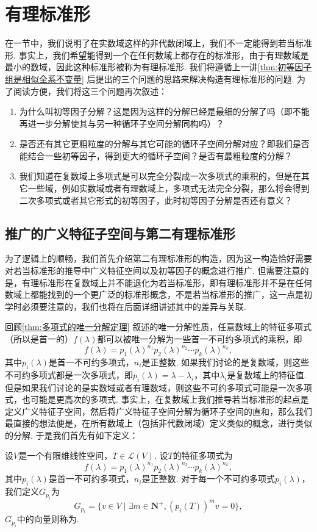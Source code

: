 \chapter{有理标准形}

在一节中，我们说明了在实数域这样的非代数闭域上，我们不一定能得到若当标准形. 事实上，我们希望能得到一个在任何数域上都存在的标准形，由于有理数域是最小的数域，因此这种标准形被称为有理标准形. 我们将遵循上一讲\autoref{thm:初等因子组是相似全系不变量} 后提出的三个问题的思路来解决构造有理标准形的问题. 为了阅读方便，我们将这三个问题再次叙述：
\begin{enumerate}
    \item 为什么叫初等因子分解？这是因为这样的分解已经是最细的分解了吗（即不能再进一步分解使其与另一种循环子空间分解同构吗）？
    \item 是否还有其它更粗粒度的分解与其它可能的循环子空间分解对应？即我们是否能结合一些初等因子，得到更大的循环子空间？是否有最粗粒度的分解？
    \item 我们知道在复数域上多项式是可以完全分裂成一次多项式的乘积的，但是在其它一些域，例如实数域或者有理数域上，多项式无法完全分裂，那么将会得到二次多项式或者其它形式的初等因子，此时初等因子分解是否还有意义？
\end{enumerate}

\section{推广的广义特征子空间与第二有理标准形}
为了逻辑上的顺畅，我们首先介绍第二有理标准形的构造，因为这一构造恰好需要对若当标准形的推导中广义特征空间以及初等因子的概念进行推广. 但需要注意的是，有理标准形在复数域上并不能退化为若当标准形，即有理标准形并不是在任何数域上都能找到的一个更广泛的标准形概念，不是若当标准形的推广，这一点是初学时必须要注意的，我们也将在后面详细讲述其中的差异与关联.

回顾\autoref{thm:多项式的唯一分解定理} 叙述的唯一分解性质，任意数域上的特征多项式（所以是首一的）$f(\lambda)$都可以被唯一分解为一些首一不可约多项式的乘积，即
\[f(\lambda)=p_1(\lambda)^{n_1}p_2(\lambda)^{n_2}\cdots p_k(\lambda)^{n_k},\]
其中$p_i(\lambda)$是首一不可约多项式，$n_i$是正整数. 如果我们讨论的是复数域，则这些不可约多项式都是一次多项式，即$p_i(\lambda)=\lambda-\lambda_i$，其中$\lambda_i$是复数域上的特征值. 但是如果我们讨论的是实数域或者有理数域，则这些不可约多项式可能是一次多项式，也可能是更高次的多项式. 事实上，在复数域上我们推导若当标准形的起点是定义广义特征子空间，然后将广义特征子空间分解为循环子空间的直和，那么我们最直接的想法便是，在所有数域上（包括非代数闭域）定义类似的概念，进行类似的分解. 于是我们首先有如下定义：
\begin{definition}{}{}
    设$V$是一个有限维线性空间，$T\in\mathcal{L}(V)$. 设$T$的特征多项式为
    \[f(\lambda)=p_1(\lambda)^{n_1}p_2(\lambda)^{n_2}\cdots p_k(\lambda)^{n_k},\]
    其中$p_i(\lambda)$是首一不可约多项式，$n_i$是正整数. 对于每一个不可约多项式$p_i(\lambda)$，我们定义$G_{p_i}$为
    \[G_{p_i}=\{v\in V\mid\exists m\in\mathbf{N}^+,(p_i(T))^mv=0\},\]
    $G_{p_i}$中的向量则称为.
\end{definition}

